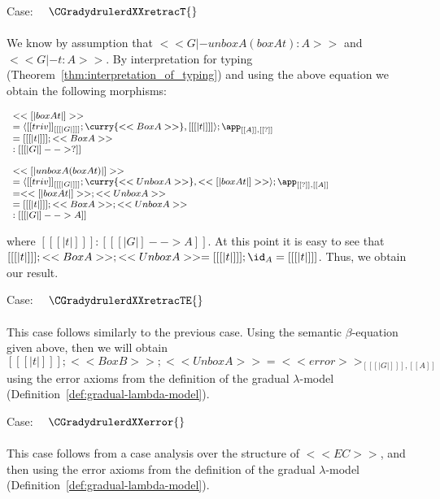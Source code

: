 \begin{description}
\item Case: $\quad \CGradydrulerdXXretracT{}$\\

  \ \\
  \noindent
  We know by assumption that $<<G |- unbox A (box A t) : A>>$ and $<<G |- t : A>>$.
  By interpretation for typing (Theorem~\ref{thm:interpretation_of_typing}) and using the above
  equation we obtain the following morphisms:
  \begin{center}
    \begin{math}\footnotesize
      \begin{array}{lll}
        << [| box A t |] >>\\
        = \langle [[triv]]_{[[ [| G |] ]]};\curry{<<Box A>>}, [[ [| t |] ]]\rangle;\app_{[[A]],[[?]]}\\
        = [[ [| t |] ]];<<Box A>>\\
        : [[ [| G |] --> ? ]]\\
        \\
        << [| unbox A (box A t) |] >> \\
        = \langle [[triv]]_{[[ [| G |] ]]};\curry{<<Unbox A>>}, << [| box A t |] >>\rangle;\app_{[[?]],[[A]]} \\
        = << [| box A t |] >>;<<Unbox A>> \\
        = [[ [| t |] ]];<<Box A>>;<<Unbox A>> \\
        : [[ [| G |] --> A ]]\\
      \end{array}
    \end{math}
  \end{center}
  where $[[ [| t |] ]] : [[ [| G |] --> A]]$.  At this point it is
  easy to see that $[[ [| t |] ]];<<Box A>>;<<Unbox A>> = [[ [| t |]
  ]];\id_A = [[ [| t |] ]]$. Thus, we obtain our result.
  

\item Case: $\quad \CGradydrulerdXXretracTE{}$\\

  \ \\
  \noindent
  This case follows similarly to the previous case.  Using the semantic $\beta$-equation given above,
  then we will obtain $[[ [| t |] ]];<<Box B>>;<<Unbox A>> = <<error>>_{[[ [| G |] ]], [[ A ]]}$ using
  the error axioms from the definition of the gradual $\lambda$-model (Definition~\ref{def:gradual-lambda-model}).
  \ \\

\item Case: $\quad \CGradydrulerdXXerror{}$\\

  \ \\
  \noindent
  This case follows from a case analysis over the structure of $<<EC>>$, and then using the error axioms
  from the definition of the gradual $\lambda$-model (Definition~\ref{def:gradual-lambda-model}).
  \ \\  

\end{description}

